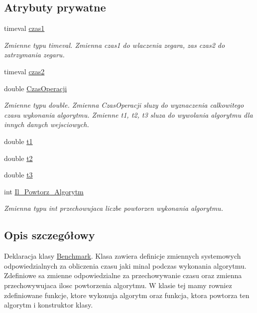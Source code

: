 \subsection*{\-Atrybuty prywatne}
\begin{DoxyCompactItemize}
\item 
timeval \hyperlink{class_benchmark_a461847eb9a01e511e19af6cd7bcc057e}{czas1}
\begin{DoxyCompactList}\small\item\em \-Zmienne typu timeval. \-Zmienna czas1 do wlaczenia zegara, zas czas2 do zatrzymania zegaru. \end{DoxyCompactList}\item 
timeval \hyperlink{class_benchmark_a56ec92a30b650825403d14907a321eea}{czas2}
\item 
double \hyperlink{class_benchmark_accd4af9649210ce216db513c0676c401}{\-Czas\-Operacji}
\begin{DoxyCompactList}\small\item\em \-Zmienne typu double. \-Zmienna \-Czas\-Operacji sluzy do wyznaczenia calkowitego czasu wykonania algorytmu. \-Zmienne t1, t2, t3 sluza do wywolania algorytmu dla innych danych wejsciowych. \end{DoxyCompactList}\item 
double \hyperlink{class_benchmark_a2f372ced372c00f69e033a117697ec54}{t1}
\item 
double \hyperlink{class_benchmark_a092579086c91c5debcb38890219e1b23}{t2}
\item 
double \hyperlink{class_benchmark_a3ee434e226ad26d10ac3629e1d5b83f3}{t3}
\item 
int \hyperlink{class_benchmark_a95ab47ba15d3d517124eecc26a81cf4c}{\-Il\-\_\-\-Powtorz\-\_\-\-Algorytm}
\begin{DoxyCompactList}\small\item\em \-Zmienna typu int przechowujaca liczbe powtorzen wykonania algorytmu. \end{DoxyCompactList}\end{DoxyCompactItemize}


\subsection{\-Opis szczegółowy}
\-Deklaracja klasy \hyperlink{class_benchmark}{\-Benchmark}. \-Klasa zawiera definicje zmiennych systemowych odpowiedzialnych za obliczenia czasu jaki minal podczas wykonania algorytmu. \-Zdefiniowe sa zmienne odpowiedzialne za przechowywanie czasu oraz zmienna przechowywujaca ilosc powtorzenia algorytmu. \-W klasie tej mamy rowniez zdefiniowane funkcje, ktore wykonuja algorytm oraz funkcja, ktora powtorza ten algorytm i konstruktor klasy. 

